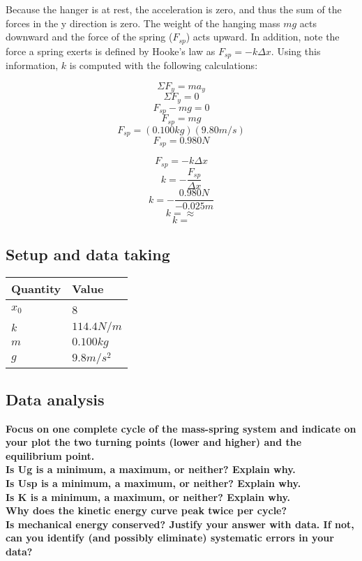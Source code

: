 \documentclass[11pt, letterpaper, includehead]{article}
\begin{document}
Because the hanger is at rest, the acceleration is zero, and thus the sum of the forces in the y
direction is zero. The weight of the hanging mass $mg$ acts downward and the force of the spring
($F_{sp}$) acts upward. In addition, note the force a spring exerts is defined by Hooke's law as $F_{sp} = -k \Delta x$. 
Using this information, $k$ is computed with the following calculations:
\begin{multicols}{2}
$$\Sigma F_y = ma_y$$
$$\Sigma F_y = 0$$
$$F_{sp} - mg = 0$$
$$F_{sp} = mg$$
$$F_{sp} = (0.100kg)(9.80m/s)$$
$$\boxed{F_{sp} = 0.980 N}$$

\columnbreak

$$F_{sp} = -k \Delta x$$
$$k = -\frac{F_{sp}}{\Delta x}$$
$$k = -\frac{0.980 N}{-0.025m}$$
$$k = \approx$$
$$\boxed{k = }$$
\end{multicols}

\subsection{Setup and data taking}
\begin{center} 
  \begin{tabular}{| m{3cm} |  m{3cm} |} 
    \hline
     \textbf{Quantity} & \textbf{Value}\\ 
      \hline
      $x_0$ & 8 \\ 
      \hline
      $k$ & $114.4 N/m$ \\ 
      \hline
      $m$ & $0.100kg$\\
      \hline
      $g$ & $9.8 m/s^2$\\
      \hline
  \end{tabular} 
\end{center}

\subsection{Data analysis}
\textbf{Focus on one complete cycle of the mass-spring system and indicate 
on your plot the two turning points (lower and higher) and the equilibrium point.}\\

\textbf{Is Ug is a minimum, a maximum, or neither? Explain why.}\\
\textbf{Is Usp is a minimum, a maximum, or neither? Explain why.}\\
\textbf{Is K is a minimum, a maximum, or neither? Explain why.}\\

\textbf{Why does the kinetic energy curve peak twice per cycle?}\\
\textbf{Is mechanical energy conserved? Justify your answer with 
data. If not, can you identify (and possibly eliminate) systematic 
errors in your data?}\\
\end{document}

